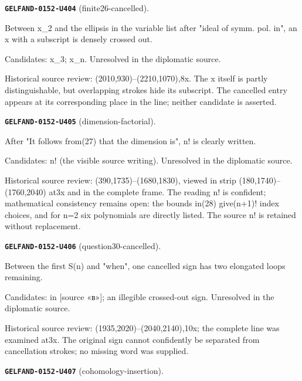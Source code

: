 \par\noindent\leavevmode{}\label{GELFAND-0152-U404}\textbf{\texttt{GELFAND-0152-U404}} (finite26-cancelled).\nopagebreak[4]\par
Between x\_2 and the ellipsis in the variable list after "ideal of symm. pol. in", an x with a subscript is densely crossed out.\par
Candidates: x\_3; x\_n. Unresolved in the diplomatic source.\par
Historical source review: (2010,930)–(2210,1070),8x. The x itself is partly distinguishable, but overlapping strokes hide its subscript. The cancelled entry appears at its corresponding place in the line; neither candidate is asserted.\par\medskip
\par\noindent\leavevmode{}\label{GELFAND-0152-U405}\textbf{\texttt{GELFAND-0152-U405}} (dimension-factorial).\nopagebreak[4]\par
After "It follows from(27) that the dimension is", n! is clearly written.\par
Candidates: n! (the visible source writing). Unresolved in the diplomatic source.\par
Historical source review: (390,1735)–(1680,1830), viewed in strip (180,1740)–(1760,2040) at3x and in the complete frame. The reading n! is confident; mathematical consistency remains open: the bounds in(28) give(n+1)! index choices, and for n=2 six polynomials are directly listed. The source n! is retained without replacement.\par\medskip
\par\noindent\leavevmode{}\label{GELFAND-0152-U406}\textbf{\texttt{GELFAND-0152-U406}} (question30-cancelled).\nopagebreak[4]\par
Between the first S(n) and "when", one cancelled sign has two elongated loops remaining.\par
Candidates: in [source «в»]; an illegible crossed-out sign. Unresolved in the diplomatic source.\par
Historical source review: (1935,2020)–(2040,2140),10x; the complete line was examined at3x. The original sign cannot confidently be separated from cancellation strokes; no missing word was supplied.\par\medskip
\par\noindent\leavevmode{}\label{GELFAND-0152-U407}\textbf{\texttt{GELFAND-0152-U407}} (cohomology-insertion).\nopagebreak[4]\par
